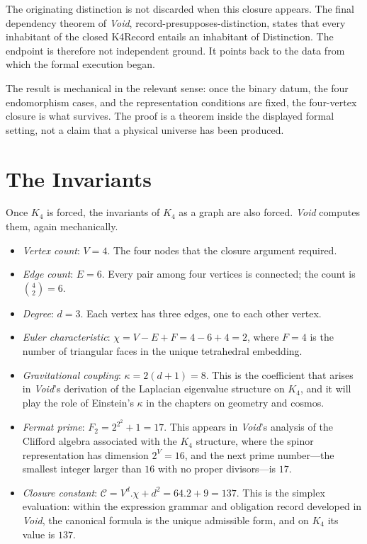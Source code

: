 \documentclass[11pt,a4paper]{book}
\def\cdot{.}%
\def\texttt#1{#1}%
\begin{document}
The originating distinction is not discarded when this closure appears. The final dependency theorem of \textit{Void}, \texttt{record-presupposes-distinction}, states that every inhabitant of the closed \texttt{K4Record} entails an inhabitant of \texttt{Distinction}. The endpoint is therefore not independent ground. It points back to the data from which the formal execution began.

The result is mechanical in the relevant sense: once the binary datum, the four endomorphism cases, and the representation conditions are fixed, the four-vertex closure is what survives. The proof is a theorem inside the displayed formal setting, not a claim that a physical universe has been produced.

\section*{The Invariants}

Once $K_4$ is forced, the invariants of $K_4$ as a graph are also forced. \textit{Void} computes them, again mechanically.

\begin{itemize}
\item \emph{Vertex count}: $V = 4$. The four nodes that the closure argument required.
\item \emph{Edge count}: $E = 6$. Every pair among four vertices is connected; the count is $\binom{4}{2} = 6$.
\item \emph{Degree}: $d = 3$. Each vertex has three edges, one to each other vertex.
\item \emph{Euler characteristic}: $\chi = V - E + F = 4 - 6 + 4 = 2$, where $F = 4$ is the number of triangular faces in the unique tetrahedral embedding.
\item \emph{Gravitational coupling}: $\kappa = 2(d+1) = 8$. This is the coefficient that arises in \textit{Void}'s derivation of the Laplacian eigenvalue structure on $K_4$, and it will play the role of Einstein's $\kappa$ in the chapters on geometry and cosmos.
\item \emph{Fermat prime}: $F_2 = 2^{2^2} + 1 = 17$. This appears in \textit{Void}'s analysis of the Clifford algebra associated with the $K_4$ structure, where the spinor representation has dimension $2^V = 16$, and the next prime number---the smallest integer larger than $16$ with no proper divisors---is $17$.
\item \emph{Closure constant}: $\mathcal{C} = V^d \cdot \chi + d^2 = 64 \cdot 2 + 9 = 137$. This is the simplex evaluation: within the expression grammar and obligation record developed in \textit{Void}, the canonical formula is the unique admissible form, and on $K_4$ its value is $137$.
\end{itemize}
\end{document}
